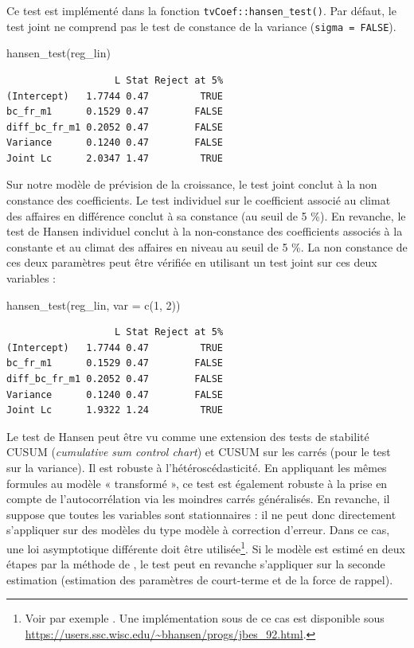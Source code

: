 \documentclass[
  a4paper,
  DIV=11,
  numbers=noendperiod,
  french]{scrartcl}
\newenvironment{Shaded}{\begin{snugshade}}{\end{snugshade}}
\newcommand{\AttributeTok}[1]{\textcolor[rgb]{0.40,0.45,0.13}{#1}}
\newcommand{\DecValTok}[1]{\textcolor[rgb]{0.68,0.00,0.00}{#1}}
\newcommand{\FunctionTok}[1]{\textcolor[rgb]{0.28,0.35,0.67}{#1}}
\newcommand{\NormalTok}[1]{\textcolor[rgb]{0.00,0.23,0.31}{#1}}
\newcommand\1{{\mathds 1}}
\theoremstyle{remark}
\begin{document}
Ce test est implémenté dans la fonction \texttt{tvCoef::hansen\_test()}.
Par défaut, le test joint ne comprend pas le test de constance de la
variance (\texttt{sigma\ =\ FALSE}).

\begin{Shaded}
\begin{Highlighting}[]
\FunctionTok{hansen\_test}\NormalTok{(reg\_lin)}
\end{Highlighting}
\end{Shaded}

\begin{verbatim}
                   L Stat Reject at 5%
(Intercept)   1.7744 0.47         TRUE
bc_fr_m1      0.1529 0.47        FALSE
diff_bc_fr_m1 0.2052 0.47        FALSE
Variance      0.1240 0.47        FALSE
Joint Lc      2.0347 1.47         TRUE
\end{verbatim}

Sur notre modèle de prévision de la croissance, le test joint conclut à
la non constance des coefficients. Le test individuel sur le coefficient
associé au climat des affaires en différence conclut à sa constance (au
seuil de 5 \%). En revanche, le test de Hansen individuel conclut à la
non-constance des coefficients associés à la constante et au climat des
affaires en niveau au seuil de 5 \%. La non constance de ces deux
paramètres peut être vérifiée en utilisant un test joint sur ces deux
variables :

\begin{Shaded}
\begin{Highlighting}[]
\FunctionTok{hansen\_test}\NormalTok{(reg\_lin, }\AttributeTok{var =} \FunctionTok{c}\NormalTok{(}\DecValTok{1}\NormalTok{, }\DecValTok{2}\NormalTok{))}
\end{Highlighting}
\end{Shaded}

\begin{verbatim}
                   L Stat Reject at 5%
(Intercept)   1.7744 0.47         TRUE
bc_fr_m1      0.1529 0.47        FALSE
diff_bc_fr_m1 0.2052 0.47        FALSE
Variance      0.1240 0.47        FALSE
Joint Lc      1.9322 1.24         TRUE
\end{verbatim}

Le test de Hansen peut être vu comme une extension des tests de
stabilité CUSUM (\emph{cumulative sum control chart}) et CUSUM sur les
carrés (pour le test sur la variance). Il est robuste à
l'hétéroscédasticité. En appliquant les mêmes formules au modèle «
transformé », ce test est également robuste à la prise en compte de
l'autocorrélation via les moindres carrés généralisés. En revanche, il
suppose que toutes les variables sont stationnaires : il ne peut donc
directement s'appliquer sur des modèles du type modèle à correction
d'erreur. Dans ce cas, une loi asymptotique différente doit être
utilisée\footnote{ Voir par exemple \textcite{hansen1992I1}. Une
  implémentation sous  de ce cas est disponible sous
  \url{https://users.ssc.wisc.edu/~bhansen/progs/jbes_92.html}.}. Si le
modèle est estimé en deux étapes par la méthode de
\textcite{engle1987co}, le test peut en revanche s'appliquer sur la
seconde estimation (estimation des paramètres de court-terme et de la
force de rappel).
\end{document}
